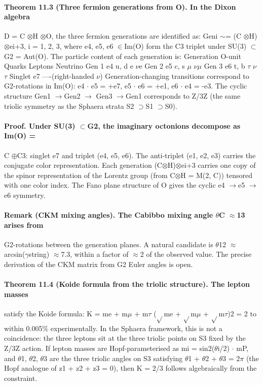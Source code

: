 \documentclass[12pt,a4paper]{article}
\begin{document}
\paragraph*{Theorem 11.3 (Three fermion generations from O). In the Dixon algebra}
D = C $\otimes$H $\otimes$O, the three fermion generations are identified as: Geni $\sim$= (C $\otimes$H) $\otimes$ei+3, i = 1, 2, 3, where e4, e5, e6 $\in$Im(O) form the C3 triplet under SU(3) $\subset$G2 = Aut(O). The particle content of each generation is:
Generation O-unit Quarks Leptons Neutrino Gen 1 e4 u, d e $\nu$e Gen 2 e5 c, s $\mu$ $\nu$$\mu$ Gen 3 e6 t, b $\tau$ $\nu$$\tau$ Singlet e7 ----(right-handed $\nu$) Generation-changing transitions correspond to G2-rotations in Im(O): e4 $\cdot$ e5 = +e7, e5 $\cdot$ e6 = +e1, e6 $\cdot$ e4 = -e3. The cyclic structure Gen1 $\to$Gen2 $\to$ Gen3 $\to$Gen1 corresponds to Z/3Z (the same triolic symmetry as the Sphaera strata S2 $\supset$S1 $\supset$S0).
\paragraph*{Proof. Under SU(3) $\subset$G2, the imaginary octonions decompose as Im(O) =}
C $\oplus$C3: singlet e7 and triplet (e4, e5, e6). The anti-triplet (e1, e2, e3) carries the conjugate color representation. Each generation (C$\otimes$H)$\otimes$ei+3 carries one copy of the spinor representation of the Lorentz group (from C$\otimes$H = M(2, C)) tensored with one color index. The Fano plane structure of O gives the cyclic e4 $\to$e5 $\to$e6 symmetry.
\paragraph*{Remark (CKM mixing angles). The Cabibbo mixing angle $\theta$C $\approx$13 arises from}
G2-rotations between the generation planes. A natural candidate is $\theta$12 $\approx$ arcsin($\gamma$string) $\approx$7.3, within a factor of $\approx$2 of the observed value. The precise derivation of the CKM matrix from G2 Euler angles is open.
\paragraph*{Theorem 11.4 (Koide formula from the triolic structure). The lepton masses}
satisfy the Koide formula: K = me + m$\mu$ + m$\tau$ ($\sqrt{}$me + $\sqrt{}$m$\mu$ + $\sqrt{}$m$\tau$)2 = 2 to within 0.005\% experimentally. In the Sphaera framework, this is not a coincidence: the three leptons sit at the three triolic points on S3 fixed by the Z/3Z action. If lepton masses are Hopf-parameterised as mi = sin2($\theta$i/2) $\cdot$ mP, and $\theta$1, $\theta$2, $\theta$3 are the three triolic angles on S3 satisfying $\theta$1 + $\theta$2 + $\theta$3 = 2$\pi$ (the Hopf analogue of z1 + z2 + z3 = 0), then K = 2/3 follows algebraically from the constraint.
\end{document}
